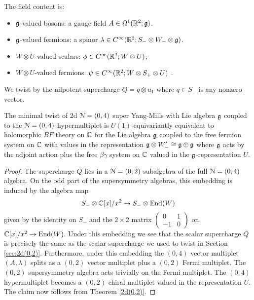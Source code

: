 \documentclass[10pt, oneside]{article}
\begin{document}
The field content is:
\begin{itemize}
\item $\mathfrak g$-valued bosons: a gauge field $A \in \Omega^1(\mathbb R^2;\mathfrak g)$.
\item $\mathfrak g$-valued fermions: a spinor $\lambda \in C^\infty(\mathbb R^2 ; S_- \otimes W_- \otimes \mathfrak g)$. 
\item $W \otimes U$-valued scalars: $\phi \in C^\infty(\mathbb R^2 ; W \otimes U)$;
\item $W \otimes U$-valued fermions: $\psi \in C^\infty(\mathbb R^2 ; W \otimes S_+ \otimes U)$ .
\end{itemize}

We twist by the nilpotent supercharge $Q = q \otimes u_1$ where $q \in S_-$ is any nonzero vector. 

\begin{thm}\label{2d(0,4)}
The minimal twist of 2d $\mathcal N=(0,4)$ super Yang-Mills with Lie algebra $\mathfrak g$ coupled to the $\mathcal N=(0,4)$ hypermultiplet is $U(1)$-equivariantly equivalent to holomorphic $BF$ theory on $\mathbb C$ for the Lie algebra $\mathfrak g$ coupled to the free fermion system on $\mathbb C$ with values in the representation $\mathfrak g \otimes W_-' \cong \mathfrak g \oplus \mathfrak g$ where $\mathfrak g$ acts by the adjoint action plus the free $\beta\gamma$ system on $\mathbb C$ valued in the $\mathfrak g$-representation $U$. 
\end{thm}

\begin{proof}
The supercharge $Q$ lies in a $\mathcal N = (0,2)$ subalgebra of the full $\mathcal N = (0,4)$ algebra.
On the odd part of the supersymmetry algebras, this embedding is induced by the algebra map
\[
S_- \otimes \mathbb C[x] / x^2 \to S_- \otimes {\rm End}(W)
\]
given by the identity on $S_-$ and the $2 \times 2$ matrix $\begin{pmatrix} 0 &1 \\ -1 & 0 \end{pmatrix}$ on $\mathbb C[x]/x^2 \to {\rm End}(W)$. 
Under this embedding we see that the scalar supercharge $Q$ is precisely the same as the scalar supercharge we used to twist in Section \ref{sec:2d(0,2)}. 
Furthermore, under this embedding the $(0,4)$ vector multiplet $(A, \lambda)$ splits as a $(0,2)$ vector multiplet plus a $(0,2)$ Fermi multiplet. 
The $(0,2)$ supersymmetry algebra acts trivially on the Fermi multiplet. 
The $(0,4)$ hypermultiplet becomes a $(0,2)$ chiral multiplet valued in the representation $U$. 
The claim now follows from Theorem \ref{2d(0,2)}. 
\end{proof}
\end{document}
